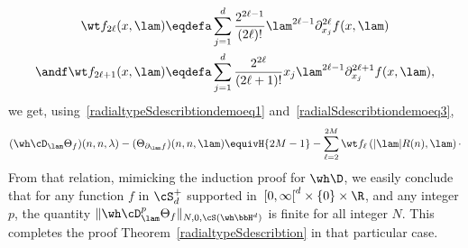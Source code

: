 \begin{align*}
\wt f_{2\ell}(x,\lam) &\eqdefa \sum_{j=1}^d \frac {2^{2\ell-1}} {(2\ell)!} \lam ^{2\ell-1} \partial_{x_j}^{2\ell} f(x, \lam)\\ \andf
\wt f_{2\ell+1} (x,\lam) &\eqdefa \sum_{j=1}^d \frac {2^{2\ell}} {(2\ell+1)!} x_j \lam ^{2\ell-1} \partial_{x_j}^{2\ell+1} f(x, \lam),
\end{align*}
we get, using~\eqref{radialtypeSdescribtiondemoeq1} and~\eqref{radialSdescribtiondemoeq3},
\[
(\wh\cD_\lam \Theta_f)(n,n,\lambda) -(\Theta_{\partial_\lam f}) (n,n,\lam) \equivH{2M-1} -\sum_{\ell=2} ^{2M} \wt f_\ell \left(|\lam| R(n),\lam\right)\cdotp
\]
{}From that relation, mimicking the induction proof for $\wh\D$, we easily conclude that for any function $f$ in $\cS_d^+$ supported in~$[0,\infty\mathclose{[}^d\times\{0\}\times \R$, and any integer $p$, the quantity $\|\wh\cD_\lam^p \Theta_f\|_{N,0,\cS(\wh\bbH^d)}$ is finite for all integer $N$. This completes the proof Theorem~\ref{radialtypeSdescribtion} in that particular case.

